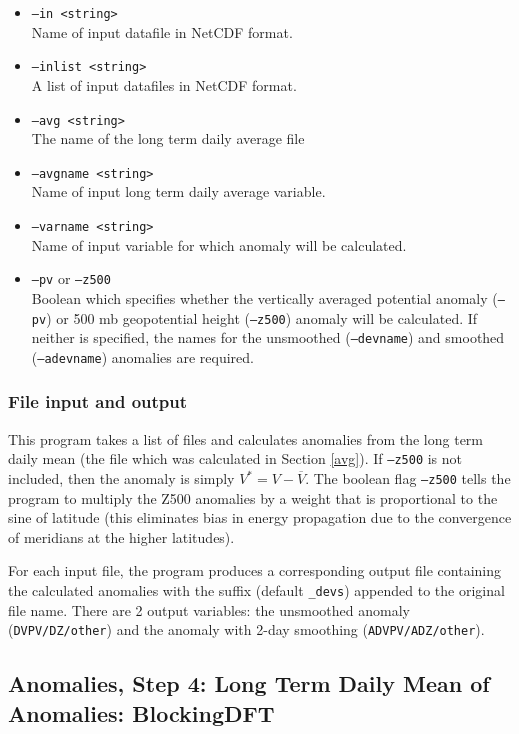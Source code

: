 \documentclass{article}
\begin{document}
\begin{itemize}
\item[]\texttt{--in <string>}\\ Name of input datafile in NetCDF format.
\item[]\texttt{--inlist <string>} \\ A list of input datafiles in NetCDF format. 
\item[] \texttt{--avg <string>}\\ The name of the long term daily average file 
\item[]\texttt{--avgname <string>}\\Name of input long term daily average variable.
\item[] \texttt{--varname <string>}\\Name of input variable for which anomaly will be calculated.
\item[]\texttt{--pv} or \texttt{--z500}\\Boolean which specifies whether the vertically averaged potential anomaly (\texttt{--pv}) or 500 mb geopotential height (\texttt{--z500}) anomaly will be calculated. If neither is specified, the names for the unsmoothed (\texttt{--devname}) and smoothed (\texttt{--adevname}) anomalies are required.
\end{itemize}

\subsubsection{File input and output}
This program takes a list of files and calculates anomalies from the long term daily mean (the file which was calculated in Section \ref{avg}). If \texttt{--z500} is not included, then the anomaly is simply $V^*=V-\overline{V}$. The boolean flag \texttt{--z500} tells the program to multiply the Z500 anomalies by a weight that is proportional to the sine of latitude (this eliminates bias in energy propagation due to the convergence of meridians at the higher latitudes).

For each input file, the program produces a corresponding output file containing the calculated anomalies with the suffix (default \texttt{\_devs}) appended to the original file name. There are 2 output variables: the unsmoothed anomaly (\texttt{DVPV/DZ/other}) and  the anomaly with 2-day smoothing (\texttt{ADVPV/ADZ/other}).


\subsection{Anomalies, Step 4: Long Term Daily Mean of Anomalies: BlockingDFT}\label{davg}
\end{document}
